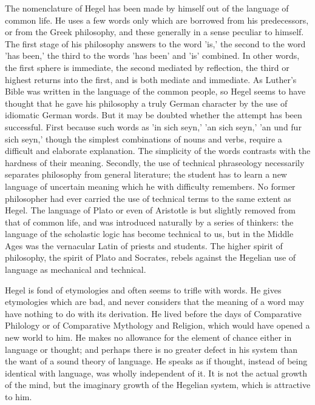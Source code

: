 \documentclass[11pt,letter]{article}
\begin{document}
\par  The nomenclature of Hegel has been made by himself out of the language of common life. He uses a few words only which are borrowed from his predecessors, or from the Greek philosophy, and these generally in a sense peculiar to himself. The first stage of his philosophy answers to the word 'is,' the second to the word 'has been,' the third to the words 'has been' and 'is' combined. In other words, the first sphere is immediate, the second mediated by reflection, the third or highest returns into the first, and is both mediate and immediate. As Luther's Bible was written in the language of the common people, so Hegel seems to have thought that he gave his philosophy a truly German character by the use of idiomatic German words. But it may be doubted whether the attempt has been successful. First because such words as 'in sich seyn,' 'an sich seyn,' 'an und fur sich seyn,' though the simplest combinations of nouns and verbs, require a difficult and elaborate explanation. The simplicity of the words contrasts with the hardness of their meaning. Secondly, the use of technical phraseology necessarily separates philosophy from general literature; the student has to learn a new language of uncertain meaning which he with difficulty remembers. No former philosopher had ever carried the use of technical terms to the same extent as Hegel. The language of Plato or even of Aristotle is but slightly removed from that of common life, and was introduced naturally by a series of thinkers: the language of the scholastic logic has become technical to us, but in the Middle Ages was the vernacular Latin of priests and students. The higher spirit of philosophy, the spirit of Plato and Socrates, rebels against the Hegelian use of language as mechanical and technical.

\par  Hegel is fond of etymologies and often seems to trifle with words. He gives etymologies which are bad, and never considers that the meaning of a word may have nothing to do with its derivation. He lived before the days of Comparative Philology or of Comparative Mythology and Religion, which would have opened a new world to him. He makes no allowance for the element of chance either in language or thought; and perhaps there is no greater defect in his system than the want of a sound theory of language. He speaks as if thought, instead of being identical with language, was wholly independent of it. It is not the actual growth of the mind, but the imaginary growth of the Hegelian system, which is attractive to him.
\end{document}
